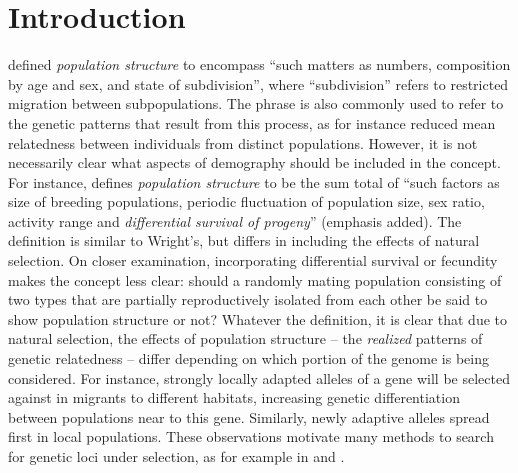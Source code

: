 \documentclass[11pt, oneside]{article}   	%
\begin{document}
\section{Introduction}


\citet{wright1949genetical} defined \emph{population structure} to encompass ``such matters as numbers, composition by age and sex, and state of subdivision'',
where ``subdivision'' refers to restricted migration between subpopulations.
The phrase is also commonly used to refer to the genetic patterns that result from this process,
as for instance reduced mean relatedness between individuals from distinct populations.
However, it is not necessarily clear what aspects of demography should be included in the concept.
For instance, 
\citet{blair1943population} defines \emph{population structure} to be the sum total of
``such factors as size of breeding populations, periodic fluctuation of population size, sex ratio, activity range and \emph{differential survival of progeny}'' (emphasis added).
The definition is similar to Wright's, but differs in including the effects of natural selection.
On closer examination, incorporating differential survival or fecundity makes the concept less clear:
should a randomly mating population consisting of two types that are partially reproductively isolated from each other
be said to show population structure or not?
Whatever the definition,
it is clear that due to natural selection, the effects of population structure --
the \emph{realized} patterns of genetic relatedness --
differ depending on which portion of the genome is being considered.
For instance, strongly locally adapted alleles of a gene will be selected against in migrants to different habitats,
increasing genetic differentiation between populations near to this gene.
Similarly, newly adaptive alleles spread first in local populations.
These observations motivate many methods to search for genetic loci under selection,
as for example in \citet{huertasnchez2013genetic} and \citet{martin2016natural}.
\end{document}
